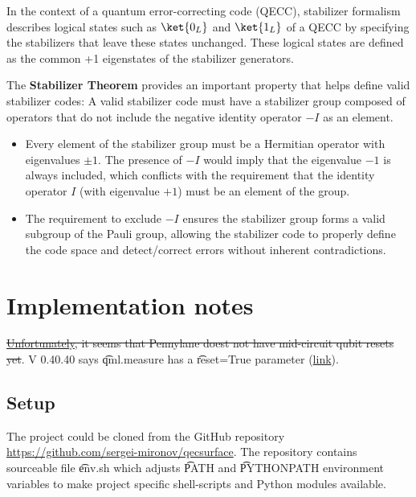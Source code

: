 \vsp

In the context of a quantum error-correcting code (QECC), stabilizer formalism describes logical
states such as \(\ket{0_L}\) and \(\ket{1_L}\) of a QECC by specifying the stabilizers that leave
these states unchanged.  These logical states are defined as the common +1 eigenstates of the
stabilizer generators.

\vsp

The \textbf{Stabilizer Theorem} provides an important property that helps define valid stabilizer
codes: A valid stabilizer code must have a stabilizer group composed of operators that do not
include the negative identity operator \(-I\) as an element.

\begin{itemize}
  \item Every element of the stabilizer group must be a Hermitian operator with eigenvalues \( \pm 1
\). The presence of \(-I\) would imply that the eigenvalue \(-1\) is always included, which
conflicts with the requirement that the identity operator \(I\) (with eigenvalue \(+1\)) must be an
element of the group.
  \item The requirement to exclude \(-I\) ensures the stabilizer group forms a valid subgroup of the
Pauli group, allowing the stabilizer code to properly define the code space and detect/correct
errors without inherent contradictions.
\end{itemize}


\section{Implementation notes}

\ls \st{\href{https://discuss.pennylane.ai/t/how-to-reset-a-specific-qubit-to-0-during-computation/1871/17}{Unfortunately},
    it seems that Pennylane doest not have mid-circuit qubit resets yet}.  V 0.40.40 says
    \t{qml.measure} has a \t{reset=True} parameter
    (\href{https://docs.pennylane.ai/en/stable/introduction/dynamic_quantum_circuits.html#conditional-operators}{link}).
\le

\subsection{Setup}

The project could be cloned from the GitHub repository
\url{https://github.com/sergei-mironov/qecsurface}. The repository contains sourceable file
\t{env.sh} which adjusts \t{PATH} and \t{PYTHONPATH} environment variables to make project specific
shell-scripts and Python modules available.

